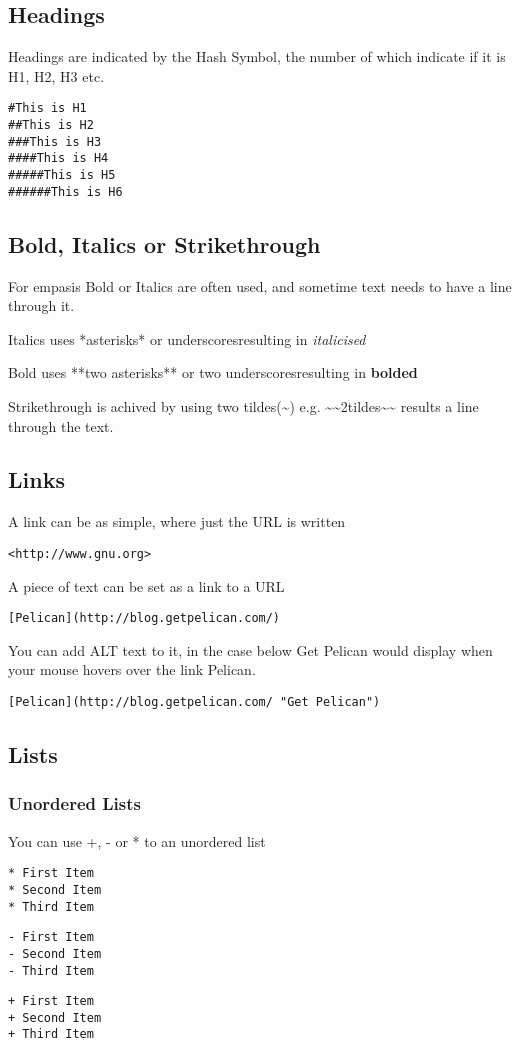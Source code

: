 \documentclass[12pt]{article}			%
\begin{document}
\subsection{Headings}
Headings are indicated by the Hash Symbol, the number of which indicate if it is H1, H2, H3 etc.
\begin{verbatim}
#This is H1
##This is H2
###This is H3
####This is H4
#####This is H5
######This is H6
\end{verbatim}
\subsection{Bold, Italics or Strikethrough}
For empasis Bold or Italics are often used, and sometime text needs to have a line through it.\par
Italics uses *asterisks* or \textunderscore underscores\textunderscore resulting in \textit{italicised} \par
Bold uses **two asterisks** or \textunderscore\textunderscore two underscores\textunderscore\textunderscore resulting in \textbf{bolded} \par


Strikethrough is achived by using two tildes(\~{}) e.g. \~{}\~{}2tildes\~{}\~{} results a line through the text.

\subsection{Links}
A link can be as simple, where just the URL is written 
\begin{verbatim}
<http://www.gnu.org>
\end{verbatim}
A piece of text can be set as a link to a URL
\begin{verbatim}
[Pelican](http://blog.getpelican.com/)
\end{verbatim}
You can add ALT text to it, in the case below Get Pelican would display when your mouse hovers over the link Pelican.
\begin{verbatim}
[Pelican](http://blog.getpelican.com/ "Get Pelican")
\end{verbatim}
\subsection{Lists}
\subsubsection{Unordered Lists}
You can use +, - or * to an unordered list
\begin{verbatim}
* First Item
* Second Item
* Third Item
\end{verbatim}
\begin{verbatim}
- First Item
- Second Item
- Third Item
\end{verbatim}
\begin{verbatim}
+ First Item
+ Second Item
+ Third Item
\end{verbatim}
\end{document}
